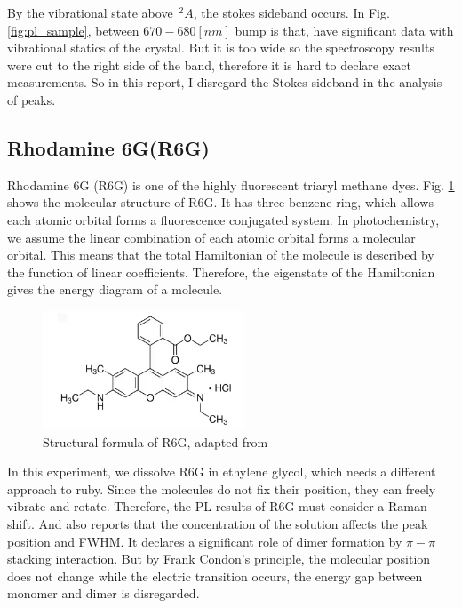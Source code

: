 \documentclass{article}
\begin{document}
By the vibrational state above $\,^2A$, the stokes sideband occurs.
In Fig. \ref{fig:pl_sample}, between $670 - 680 [nm]$ bump is that, have significant data with vibrational statics of the crystal.
But it is too wide so the spectroscopy results were cut to the right side of the band, therefore it is hard to declare exact measurements.
So in this report, I disregard the Stokes sideband in the analysis of peaks.


\subsection{Rhodamine 6G(R6G)}
 Rhodamine 6G (R6G) is one of the highly fluorescent triaryl methane dyes.
 Fig. \ref{fig:rhodamine_structure} shows the molecular structure of R6G.
 It has three benzene ring, which allows each atomic orbital forms a fluorescence conjugated system.
 In photochemistry, we assume the linear combination of each atomic orbital forms a molecular orbital.
 This means that the total Hamiltonian of the molecule is described by the function of linear coefficients.
 Therefore, the eigenstate of the Hamiltonian gives the energy diagram of a molecule.
 \begin{figure}[ht]
  \centering
  \includegraphics[width=6cm]{../results/Rhodamin_structure.png}
  \caption{Structural formula of R6G, adapted from \cite{rhodamine_sigma_aldrich}}
  \label{fig:rhodamine_structure}
 \end{figure}
 In this experiment, we dissolve R6G in ethylene glycol, which needs a different approach to ruby.
 Since the molecules do not fix their position, they can freely vibrate and rotate.
 Therefore, the PL results of R6G must consider a Raman shift.
 And also \cite{Rhodamine_dimer} reports that the concentration of the solution affects the peak position and FWHM.
 It declares a significant role of dimer formation by $\pi -\pi$ stacking interaction.
 But by Frank Condon's principle, the molecular position does not change while the electric transition occurs, the energy gap between monomer and dimer is disregarded.
\end{document}
